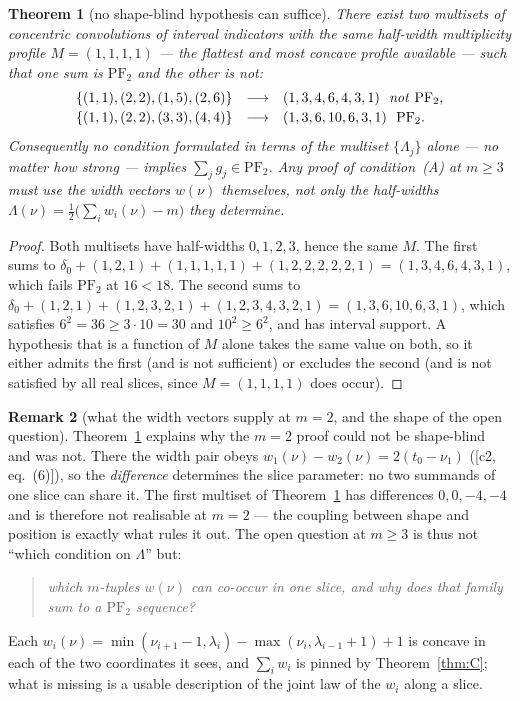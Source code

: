 \documentclass[11pt]{article}
\newtheorem{theorem}{Theorem}[section]
\theoremstyle{definition}
\newtheorem{remark}[theorem]{Remark}
\newcommand{\PFtwo}{\mathrm{PF}_2}
\begin{document}
\begin{theorem}[no shape-blind hypothesis can suffice]\label{thm:blind}
There exist two multisets of concentric convolutions of interval indicators with the
\emph{same} half-width multiplicity profile $M=(1,1,1,1)$ --- the flattest and most concave
profile available --- such that one sum is $\PFtwo$ and the other is not:
\[
\begin{array}{lll}
  \{(1,1),(2,2),(1,5),(2,6)\} &\longrightarrow& (1,3,4,6,4,3,1)\ \ \text{\emph{not} }\PFtwo,\\[2pt]
  \{(1,1),(2,2),(3,3),(4,4)\} &\longrightarrow& (1,3,6,10,6,3,1)\ \ \PFtwo.
\end{array}
\]
Consequently no condition formulated in terms of the multiset $\{\Lambda_j\}$ alone --- no
matter how strong --- implies $\sum_jg_j\in\PFtwo$. Any proof of condition~(A) at $m\ge3$
must use the \emph{width vectors} $w(\nu)$ themselves, not only the half-widths
$\Lambda(\nu)=\tfrac12\bigl(\sum_iw_i(\nu)-m\bigr)$ they determine.
\end{theorem}
\begin{proof}
Both multisets have half-widths $0,1,2,3$, hence the same $M$. The first sums to
$\delta_0+(1,2,1)+(1,1,1,1,1)+(1,2,2,2,2,2,1)=(1,3,4,6,4,3,1)$, which fails $\PFtwo$ at
$16<18$. The second sums to
$\delta_0+(1,2,1)+(1,2,3,2,1)+(1,2,3,4,3,2,1)=(1,3,6,10,6,3,1)$, which satisfies
$6^2=36\ge3\cdot10=30$ and $10^2\ge6^2$, and has interval support. A hypothesis that is a
function of $M$ alone takes the same value on both, so it either admits the first (and is
not sufficient) or excludes the second (and is not satisfied by all real slices, since
$M=(1,1,1,1)$ does occur).
\end{proof}

\begin{remark}[what the width vectors supply at $m=2$, and the shape of the open question]
Theorem~\ref{thm:blind} explains why the $m=2$ proof could not be shape-blind and was not.
There the width pair obeys $w_1(\nu)-w_2(\nu)=2(t_0-\nu_1)$ ([c2, eq.~(6)]), so the
\emph{difference} determines the slice parameter: no two summands of one slice can share it.
The first multiset of Theorem~\ref{thm:blind} has differences $0,0,-4,-4$ and is therefore
not realisable at $m=2$ --- the coupling between shape and position is exactly what rules it
out. The open question at $m\ge3$ is thus not ``which condition on $\Lambda$'' but:
\begin{quote}
  \emph{which $m$-tuples $w(\nu)$ can co-occur in one slice, and why does that family
  sum to a $\PFtwo$ sequence?}
\end{quote}
Each $w_i(\nu)=\min(\nu_{i+1}-1,\lambda_i)-\max(\nu_i,\lambda_{i-1}+1)+1$ is concave in each
of the two coordinates it sees, and $\sum_iw_i$ is pinned by Theorem~\ref{thm:C}; what is
missing is a usable description of the joint law of the $w_i$ along a slice.
\end{remark}
\end{document}
